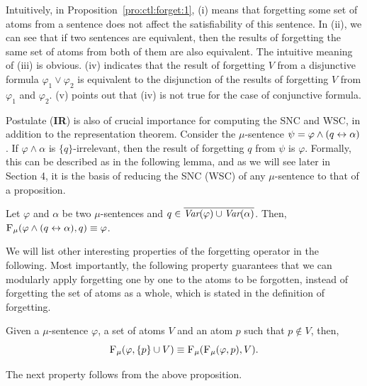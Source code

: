 \documentclass[runningheads]{llncs}
\begin{document}
Intuitively, in Proposition~\ref{pro:ctl:forget:1}, (i) means that forgetting some set of atoms from a sentence does not affect the satisfiability of this sentence. In (ii), we can see that if two sentences are equivalent, then the results of forgetting the same set of atoms from both of them are also equivalent. The intuitive meaning of (iii) is obvious. (iv) indicates that the result of forgetting $V$ from a disjunctive formula $\varphi_1 \vee \varphi_2$ is equivalent to the disjunction of the results of forgetting $V$ from $\varphi_1$ and $\varphi_2$. (v) points out that (iv) is not true for the case of conjunctive formula.


Postulate (\textbf{IR}) is also of crucial importance for computing the SNC and WSC, in addition to the representation theorem. Consider the $\mu$-sentence $\psi = \varphi \wedge (q \leftrightarrow \alpha)$. If $\varphi \wedge \alpha$ is $\{q\}$-irrelevant, then the result of forgetting $q$ from $\psi$ is $\varphi$. Formally, this can be described as in the following lemma, and as we will  see later in Section 4, it is the basis of reducing the SNC (WSC) of any $\mu$-sentence to that of a proposition.

\begin{lemma}
\label{lem:KF:eq}
Let $\varphi$ and $\alpha$ be two $\mu$-sentences and $q\in 	\overline{\textit{Var}(\varphi) \cup \textit{Var}(\alpha)}$. Then,
 	${\textsc{F}_{\textsc{$\mu$}}}(\varphi \wedge (q\leftrightarrow\alpha), q)\equiv \varphi$.
\end{lemma}

 We will list other interesting properties of the forgetting operator in the following.
 Most importantly, the following property guarantees that we can modularly apply forgetting one by one to the atoms to be forgotten, instead of forgetting the set of atoms as a whole, which is stated in the definition of forgetting.


 \begin{proposition}[Modularity]\label{disTF}  Given a $\mu$-sentence $\varphi$, a set of atoms $V$ and an atom $p$ such that $p \notin V$, then,
 \[
 {\textsc{F}_{\textsc{$\mu$}}}(\varphi, \{p\} \cup V) \equiv {\textsc{F}_{\textsc{$\mu$}}}({\textsc{F}_{\textsc{$\mu$}}}(\varphi, p), V).
 \]
 \end{proposition}

The next property follows from the above proposition.
\end{document}
